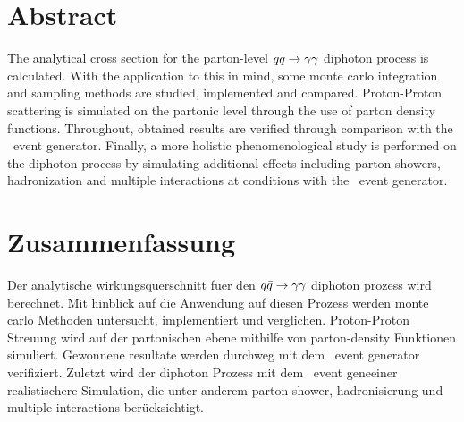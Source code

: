 \section*{Abstract}

The analytical cross section for the parton-level \(q\bar{q}\rightarrow\gamma\gamma\) diphoton
process is calculated.  With the application to this in mind, some
monte carlo integration and sampling methods are studied, implemented
and compared. Proton-Proton scattering is simulated on the partonic
level through the use of parton density functions. Throughout,
obtained results are verified through comparison with the \sherpa\
event generator. Finally, a more holistic phenomenological study is
performed on the diphoton process by simulating additional effects
including parton showers, hadronization and multiple interactions at
\lhc conditions with the \sherpa\ event generator.

\section*{Zusammenfassung}

Der analytische wirkungsquerschnitt fuer den \(q\bar{q}\rightarrow\gamma\gamma\) diphoton prozess
wird berechnet. Mit hinblick auf die Anwendung auf diesen Prozess
werden monte carlo Methoden untersucht, implementiert und
verglichen. Proton-Proton Streuung wird auf der partonischen ebene
mithilfe von parton-density Funktionen simuliert.  Gewonnene resultate
werden durchweg mit dem \sherpa\ event generator verifiziert. Zuletzt
wird der diphoton Prozess mit dem \sherpa\ event geneeiner
realistischere Simulation, die unter anderem parton shower,
hadronisierung und multiple interactions ber\"ucksichtigt.

